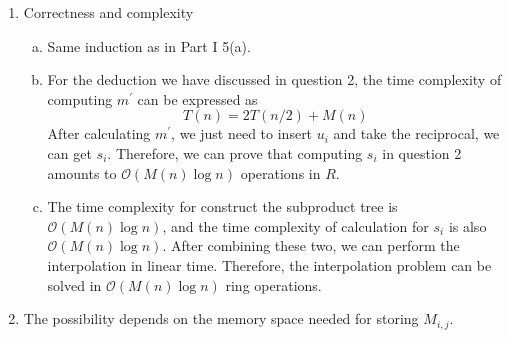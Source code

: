 \documentclass[12pt, a4paper]{article}
\begin{document}
\begin{enumerate}
          \begin{algorithm}[!htb]
              \caption{Interpolation for $P$}
              \BlankLine
          \end{algorithm}
          \newpage
    \item Correctness and complexity
          \begin{enumerate}[a)]
              \item Same induction as in Part I 5(a).
              \item For the deduction we have discussed in question 2, the time complexity of computing $m^\prime$ can be expressed as
                    \[T(n) = 2T(n/2) + M(n)\]
                    After calculating $m^\prime$, we just need to insert $u_i$ and take the reciprocal, we can get $s_i$. 
                    Therefore, we can prove that computing $s_i$ in question 2 amounts to $\mathcal{O}(M(n)\log n)$ operations in $R$.
              \item The time complexity for construct the subproduct tree is $\mathcal{O}(M(n)\log n)$, 
                    and the time complexity of calculation for $s_i$ is also $\mathcal{O}(M(n)\log n)$. 
                    After combining these two, we can perform the interpolation in linear time. 
                    Therefore, the interpolation problem can be solved in $\mathcal{O}(M(n)\log n)$ ring operations.
          \end{enumerate}
    \item The possibility depends on the memory space needed for storing $M_{i, j}$.

\end{enumerate}

\newpage
\end{document}
